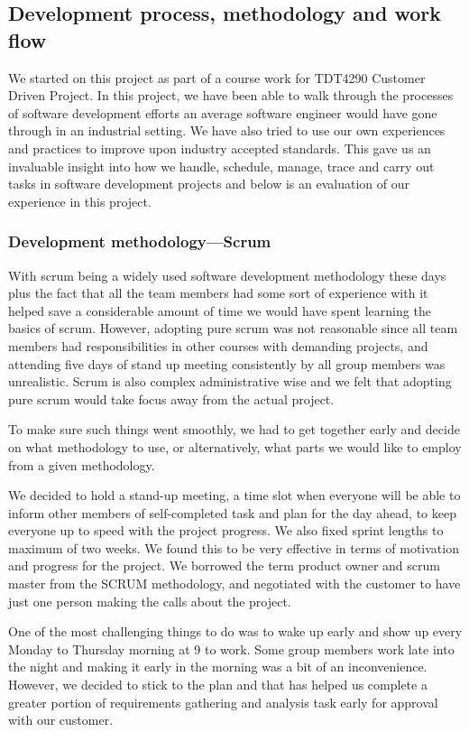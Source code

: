 \subsection{Development process, methodology and work flow}

We started on this project as part of a course work for TDT4290 Customer
Driven Project. In this project, we have been able to walk through the processes
of software development efforts an average software engineer would have gone
through in an industrial setting. We have also tried to use our own experiences
and practices to improve upon industry accepted standards.
This gave us an invaluable insight into how we handle, schedule,
manage, trace and carry out tasks in software development projects and below is
an evaluation of our experience in this project.

	\subsubsection{Development methodology---Scrum}

With scrum being a widely used software development methodology these days
plus the fact that all the team members had some sort of experience with it
helped save a considerable amount of time we would have spent learning the
basics of scrum. However, adopting pure scrum  was not reasonable since all team
members had responsibilities in other courses with demanding projects, and
attending five days of stand up meeting consistently by all group members was
unrealistic. Scrum is also complex administrative wise and we felt that adopting
pure scrum would take focus away from the actual project.

To make sure such things went smoothly, we had to get together early and decide
on what methodology to use, or alternatively, what parts we would like to
employ from a given methodology.

We decided to hold a stand-up meeting, a time slot when everyone will
be able to inform other members of self-completed task and plan for the day
ahead, to keep everyone up to speed with the project progress. We also fixed
sprint lengths to maximum of two weeks. We found this to be very effective in
terms of motivation and progress for the project. We borrowed the term product
owner and scrum master from the SCRUM methodology, and negotiated with the
customer to have just one person making the calls about the project.

One of the most challenging things to do was to wake up early and show up every
Monday to Thursday morning at 9 to work. Some group members work late
into the night and making it early in the morning was a bit of an inconvenience.
However, we decided to stick to the plan and that has helped us complete a greater
portion of requirements gathering and analysis task early for approval with our
customer.

